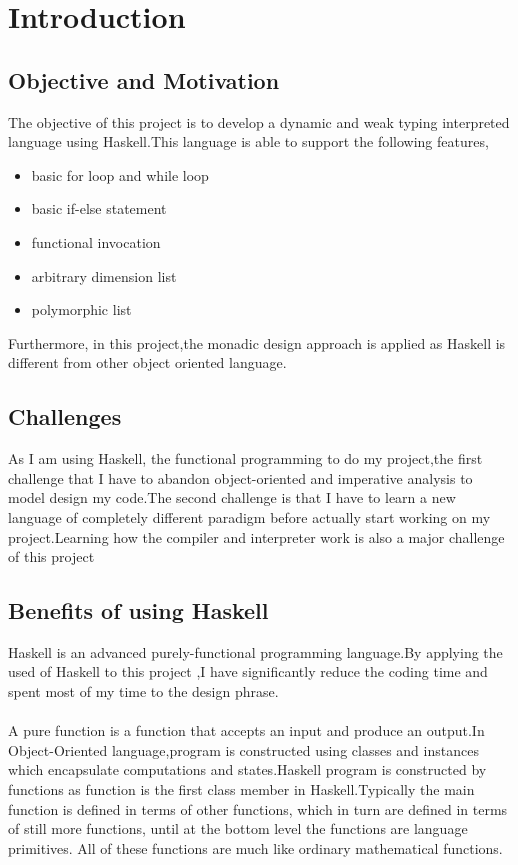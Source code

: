 \chapter{Introduction}
\section{Objective and Motivation}
The objective of this project is to develop a dynamic and weak typing interpreted language using Haskell.This language is able to support the following features,
\begin{itemize}
\item basic for loop and while loop
\item basic if-else statement
\item functional invocation 
\item arbitrary dimension list
\item polymorphic list
\end{itemize}

Furthermore, in this project,the monadic design approach is applied as Haskell is different from other object oriented language.


\section{Challenges}
As I am using Haskell, the functional programming to do my project,the first challenge  that I have to abandon object-oriented and imperative analysis to model design my code.The second challenge is that I have to learn a new language of completely different paradigm before actually start working on my project.Learning how the compiler and interpreter work is also a major challenge of this project

\section{Benefits of using Haskell} 
Haskell is an advanced purely-functional programming language.By applying the used of Haskell to this project ,I have significantly reduce the coding time and spent most of my time to the design phrase.
\\
\\
A pure function is a function that accepts an input and produce an output.In Object-Oriented language,program is constructed using classes and instances which encapsulate computations and states.Haskell program is constructed by functions as function is the first class member in Haskell.Typically the main function is defined in terms of other functions, which in turn are defined in terms of still more functions, until at the bottom level the functions are language primitives. All of these functions are much like ordinary mathematical functions.  \cite{why} \cite{overloading}
